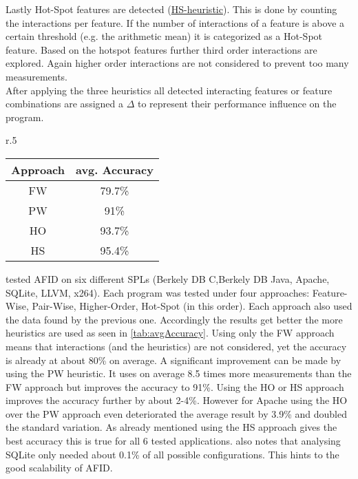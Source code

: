 Lastly Hot-Spot features are detected (\hyperref[lab:HS]{HS-heuristic}). This is done by counting the interactions per feature. If the number of interactions of a feature is above a certain threshold (e.g. the arithmetic mean) it is categorized as a Hot-Spot feature. Based on the hotspot features further third order interactions are explored. Again higher order interactions are not considered to prevent too many measurements. \\
After applying the three heuristics all detected interacting features or feature combinations are assigned a $\Delta$ to represent their performance influence on the program.

\begin{wrapfigure}{r}{.5\textwidth}
	\centering
	\setlength{}
	\label{tab:avgAccuracy}
	\begin{tabular}{c|c}
		Approach&avg. Accuracy\\\midrule[1pt]
		FW&79.7\%\\\hline
		PW&91\%\\\hline
		HO&93.7\%\\\hline
		HS&95.4\%\\\hline
	\end{tabular}
\end{wrapfigure}\noindent
\citet{AutomatedFeatureDetectionSiegmund2012} tested AFID on six different SPLs (Berkely DB C,Berkely DB Java, Apache, SQLite, LLVM, x264). Each program was tested under four approaches: Feature-Wise, Pair-Wise, Higher-Order, Hot-Spot (in this order). Each approach also used the data found by the previous one. Accordingly the results get better the more heuristics are used as seen in \cref{tab:avgAccuracy}. Using only the FW approach means that interactions (and the heuristics) are not considered, yet the accuracy is already at about 80\% on average. A significant improvement can be made by using the PW heuristic. It uses on average 8.5 times more measurements than the FW approach but improves the accuracy to 91\%. Using the HO or HS approach improves the accuracy further by about 2-4\%. However for Apache using the HO over the PW approach even deteriorated the average result by 3.9\% and doubled the standard variation. As already mentioned using the HS approach gives the best accuracy this is true for all 6 tested applications. \citet{AutomatedFeatureDetectionSiegmund2012} also notes that analysing SQLite only needed about 0.1\% of all possible configurations. This hints to the good scalability of AFID.
